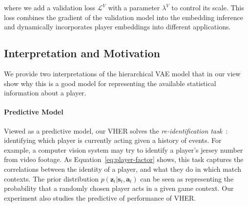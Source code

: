\documentclass[letterpaper]{article} %
\newcommand{\context}{c}
\newcommand{\expect}{\mathbb{E}}
\newcommand{\latentvariables}{\mathbf{z}}
\newcommand{\inference}{q}
\newcommand{\generation}{p}
\newcommand{\state}{\mathbf{s}}
\newcommand{\action}{\mathbf{a}}
\newcommand{\player}{pl}
\newcommand{\prior}{p}
\begin{document}
\noindent where we add a validation loss $\mathcal{L}^{V}$ with a parameter $\lambda^{V}$ to control its scale. This loss combines the gradient of the validation model into the embedding inference and dynamically incorporates player embeddings into different applications. 




\subsection{Interpretation and Motivation}

We provide two interpretations of the hierarchical VAE model that in our view show why this is a good model for representing the available statistical information about a player. 

\paragraph{Predictive Model}
Viewed as a predictive model, our VHER solves the {\em re-identification task}~\cite{LaviRID2018}: identifying which player is currently acting given a history of events. For example, a computer vision system may try to identify a player's jersey number from video footage. As Equation~\eqref{eq:player-factor} shows, this task captures the correlations between the identity of a player, and what they do in which match contexts. The prior distribution $\prior(\latentvariables_{t}|\state_{t},\action_{t})$ can be seen as representing the probability  that a randomly chosen player acts in a given game context. 
Our experiment also studies the predictive of performance of VHER.
\end{document}
